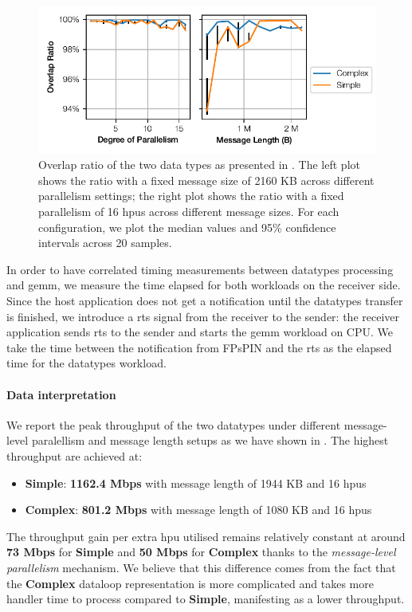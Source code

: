 \begin{figure}[tp]
    \centering
    \includegraphics{thesis/figures/datatypes-overlap.pdf}
    \caption{Overlap ratio of the two data types as presented in .  The left plot shows the ratio with a fixed message size of 2160 KB across different parallelism settings; the right plot shows the ratio with a fixed parallelism of 16 \ac{hpu}s across different message sizes.  For each configuration, we plot the median values and 95\% confidence intervals across 20 samples.} \label{fig:datatypes-overlap}
\end{figure}

In order to have correlated timing measurements between datatypes processing and \ac{gemm}, we measure the time elapsed for both workloads on the receiver side.  Since the host application does not get a notification until the datatypes transfer is finished, we introduce a \ac{rts} signal from the receiver to the sender: the receiver application sends \ac{rts} to the sender and starts the \ac{gemm} workload on CPU.  We take the time between the notification from FPsPIN and the \ac{rts} as the elapsed time for the datatypes workload.

\paragraph{Data interpretation} We report the peak throughput of the two datatypes under different message-level paralellism and message length setups as we have shown in .  The highest throughput are achieved at:
\begin{itemize}
    \item \textbf{Simple}: \textbf{1162.4 Mbps} with message length of 1944 KB and 16 \ac{hpu}s
    \item \textbf{Complex}: \textbf{801.2 Mbps} with message length of 1080 KB and 16 \ac{hpu}s
\end{itemize}
The throughput gain per extra \ac{hpu} utilised remains relatively constant at around \textbf{73 Mbps} for \textbf{Simple} and \textbf{50 Mbps} for \textbf{Complex} thanks to the \emph{message-level parallelism} mechanism.  We believe that this difference comes from the fact that the \textbf{Complex} dataloop representation is more complicated and takes more handler time to process compared to \textbf{Simple}, manifesting as a lower throughput.

